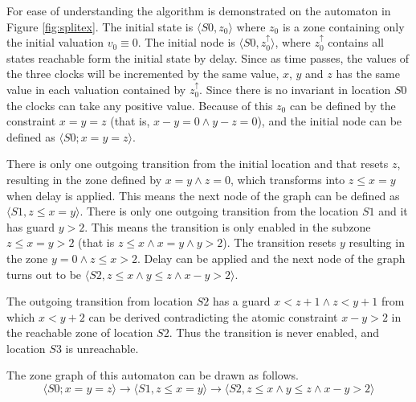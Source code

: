 \begin{example}


For ease of understanding the algorithm is demonstrated on the automaton in Figure \ref{fig:splitex}. The initial state is  $\langle S0, z_0 \rangle$ where $z_0$ is a zone containing only the initial valuation $v_0 \equiv 0$. The initial node is  $\langle S0, z_0^\uparrow  \rangle$, where $z_0^\uparrow$ contains all states reachable form the initial state by delay. Since as time passes, the values of the three clocks will be incremented by the same value, $x$, $y$ and $z$ has the same value in each valuation contained by $z_0^\uparrow$. Since there is no invariant in location $S0$ the clocks can take any positive value. Because of this $z_0$ can be defined by the constraint $x=y=z$ (that is, $x-y = 0 \wedge y-z=0 $), and the initial node can be defined as $\langle S0; x=y=z  \rangle$.

There is only one outgoing transition from the initial location and that resets $z$, resulting in the zone defined by $x=y \wedge z=0$, which transforms into $z \leq x=y$ when delay is applied. This means the next node of the graph can be defined as $\langle S1, z \leq x=y \rangle$. There is only one outgoing transition from the location $S1$ and it has guard $y>2$. This means the transition is only enabled in the subzone $z \leq x=y>2$ (that is $z \leq x \wedge x=y \wedge y>2$). The transition resets $y$ resulting in the zone $y=0 \wedge z \leq x > 2$. Delay can be applied and the next node of the graph turns out to be $\langle S2, z \leq x \wedge y \leq z \wedge x-y>2 \rangle$.

The outgoing transition from location $S2$ has a guard $x<z+1 \wedge z<y+1$ from which $x<y+2$ can be derived contradicting the atomic constraint $x-y>2$ in the reachable zone of location $S2$. Thus the transition is never enabled, and location $S3$ is unreachable.

The zone graph of this automaton can be drawn as follows.\[\langle S0; x=y=z  \rangle \to \langle S1, z \leq x=y \rangle \to \langle S2, z \leq x \wedge y \leq z \wedge x-y>2 \rangle \]

\end{example}

